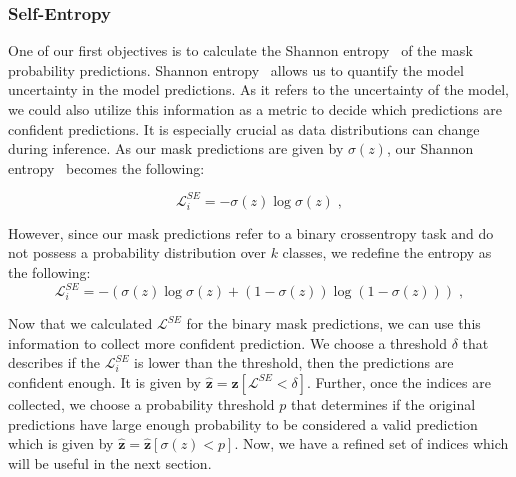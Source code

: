 \subsubsection{Self-Entropy}\label{sec:tta-se}
One of our first objectives is to calculate the Shannon entropy~\cite{shannon1948mathematical} of the mask probability predictions. Shannon entropy~\cite{shannon1948mathematical} allows us to quantify the model uncertainty in the model predictions. As it refers to the uncertainty of the model, we could also utilize this information as a metric to decide which predictions are confident predictions. It is especially crucial as data distributions can change during inference. As our mask predictions are given by $\sigma(z)$, our Shannon entropy~\cite{shannon1948mathematical} becomes the following:

\begin{equation}
    \mathcal{L}_i^{SE} = -\sigma(z) \log \sigma(z) \; ,
\end{equation}

However, since our mask predictions refer to a binary crossentropy task and do not possess a probability distribution over $k$ classes, we redefine the entropy as the following:
\begin{equation}
    \mathcal{L}_i^{SE} = -(\sigma(z) \log \sigma(z) + (1-\sigma(z)) \log (1-\sigma(z))) \; ,
\end{equation}

Now that we calculated $\mathcal{L}^{SE}$ for the binary mask predictions, we can use this information to collect more confident prediction. We choose a threshold $\delta$ that describes if the $\mathcal{L}_i^{SE}$ is lower than the threshold, then the predictions are confident enough. It is given by $\hat{\bm{z}} = \bm{z}[\mathcal{L}^{SE}<\delta]$. Further, once the indices are collected, we choose a probability threshold $p$ that determines if the original predictions have large enough probability to be considered a valid prediction which is given by $\hat{\bm{z}} = \hat{\bm{z}}[\sigma(z)<p]$. Now, we have a refined set of indices which will be useful in the next section. 

